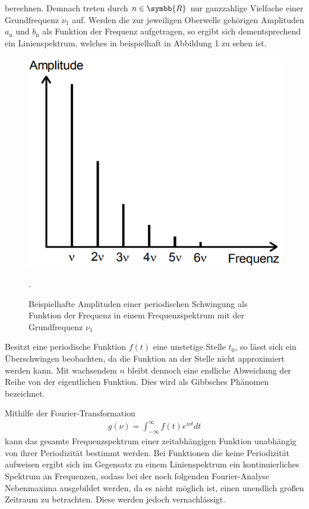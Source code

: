 berechnen. Demnach treten durch $n \in \symbb{R}$ nur ganzzahlige Vielfache einer Grundfrequenz $\nu_\text{1}$ auf.
Werden die zur jeweiligen Oberwelle gehörigen Amplituden $a_\text{n}$ und $b_\text{n}$ als Funktion der Frequenz
aufgetragen, so ergibt sich dementsprechend ein Linienspektrum, welches in beispielhaft in Abbildung 1
zu sehen ist.

\begin{figure}
\centering
\includegraphics[scale=0.5]{frequenz.png}
\caption{Beispielhafte Amplituden einer periodischen Schwingung als Funktion der Frequenz in einem Frequenzspektrum mit der Grundfrequenz $\nu_\text{1}$ \cite[S. 271]{sample}}.
\label{fig:frequenz}
\end{figure}

Besitzt eine periodische Funktion $f(t)$ eine unstetige Stelle $t_\text{0}$, so lässt sich ein
Überschwingen beobachten, da die Funktion an der Stelle nicht approximiert werden kann. Mit wachsendem $n$ bleibt dennoch
eine endliche Abweichung der Reihe von der eigentlichen Funktion. Dies wird als Gibbsches Phänomen bezeichnet.

Mithilfe der Fourier-Transformation
\begin{align}
g(\nu) = \int_{-\infty}^\infty f(t) e^{i \nu t} dt
\end{align}
kann das gesamte Frequenzspektrum einer zeitabhängigen Funktion
unabhängig von ihrer Periodizität bestimmt werden.
Bei Funktionen die keine Periodizität aufweisen ergibt sich 
im Gegensatz zu einem Linienspektrum ein kontinuierliches Spektrum an Frequenzen, sodass bei der noch folgenden
Fourier-Analyse Nebenmaxima ausgebildet werden, da es nicht möglich ist, einen unendlich
großen Zeitraum zu betrachten. Diese werden jedoch vernachlässigt.
